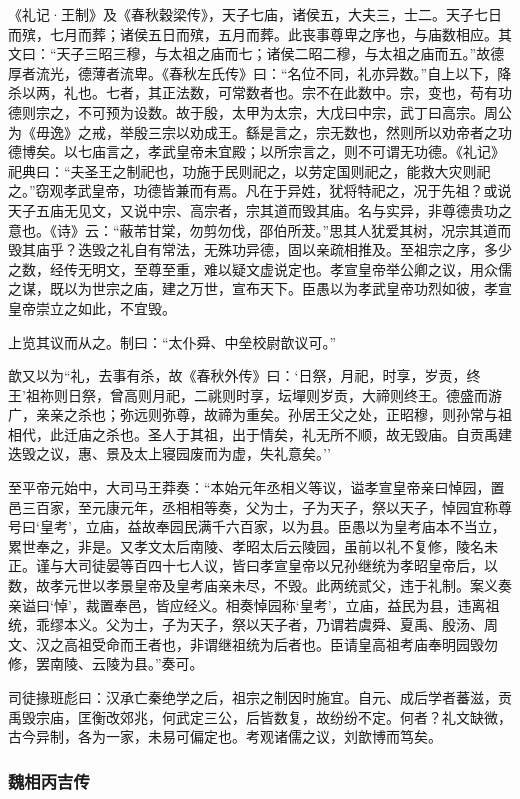 \documentclass[]{article}
\begin{document}
《礼记·王制》及《春秋穀梁传》，天子七庙，诸侯五，大夫三，士二。天子七日而殡，七月而葬；诸侯五日而殡，五月而葬。此丧事尊卑之序也，与庙数相应。其文曰：``天子三昭三穆，与太祖之庙而七；诸侯二昭二穆，与太祖之庙而五。''故德厚者流光，德薄者流卑。《春秋左氏传》曰：``名位不同，礼亦异数。''自上以下，降杀以两，礼也。七者，其正法数，可常数者也。宗不在此数中。宗，变也，苟有功德则宗之，不可预为设数。故于殷，太甲为太宗，大戊曰中宗，武丁曰高宗。周公为《毋逸》之戒，举殷三宗以劝成王。繇是言之，宗无数也，然则所以劝帝者之功德博矣。以七庙言之，孝武皇帝未宜殿；以所宗言之，则不可谓无功德。《礼记》祀典曰：``夫圣王之制祀也，功施于民则祀之，以劳定国则祀之，能救大灾则祀之。''窃观孝武皇帝，功德皆兼而有焉。凡在于异姓，犹将特祀之，况于先祖？或说天子五庙无见文，又说中宗、高宗者，宗其道而毁其庙。名与实异，非尊德贵功之意也。《诗》云：``蔽芾甘棠，勿剪勿伐，邵伯所茇。''思其人犹爱其树，况宗其道而毁其庙乎？迭毁之礼自有常法，无殊功异德，固以亲疏相推及。至祖宗之序，多少之数，经传无明文，至尊至重，难以疑文虚说定也。孝宣皇帝举公卿之议，用众儒之谋，既以为世宗之庙，建之万世，宣布天下。臣愚以为孝武皇帝功烈如彼，孝宣皇帝崇立之如此，不宜毁。

上览其议而从之。制曰：``太仆舜、中垒校尉歆议可。''

歆又以为``礼，去事有杀，故《春秋外传》曰：`日祭，月祀，时享，岁贡，终王'祖祢则日祭，曾高则月祀，二祧则时享，坛墠则岁贡，大禘则终王。德盛而游广，亲亲之杀也；弥远则弥尊，故禘为重矣。孙居王父之处，正昭穆，则孙常与祖相代，此迁庙之杀也。圣人于其祖，出于情矣，礼无所不顺，故无毁庙。自贡禹建迭毁之议，惠、景及太上寝园废而为虚，失礼意矣。''

至平帝元始中，大司马王莽奏：``本始元年丞相义等议，谥孝宣皇帝亲曰悼园，置邑三百家，至元康元年，丞相相等奏，父为士，子为天子，祭以天子，悼园宜称尊号曰`皇考'，立庙，益故奉园民满千六百家，以为县。臣愚以为皇考庙本不当立，累世奉之，非是。又孝文太后南陵、孝昭太后云陵园，虽前以礼不复修，陵名未正。谨与大司徒晏等百四十七人议，皆曰孝宣皇帝以兄孙继统为孝昭皇帝后，以数，故孝元世以孝景皇帝及皇考庙亲未尽，不毁。此两统贰父，违于礼制。案义奏亲谥曰`悼'，裁置奉邑，皆应经义。相奏悼园称`皇考'，立庙，益民为县，违离祖统，乖缪本义。父为士，子为天子，祭以天子者，乃谓若虞舜、夏禹、殷汤、周文、汉之高祖受命而王者也，非谓继祖统为后者也。臣请皇高祖考庙奉明园毁勿修，罢南陵、云陵为县。''奏可。

司徒掾班彪曰：汉承亡秦绝学之后，祖宗之制因时施宜。自元、成后学者蕃滋，贡禹毁宗庙，匡衡改郊兆，何武定三公，后皆数复，故纷纷不定。何者？礼文缺微，古今异制，各为一家，未易可偏定也。考观诸儒之议，刘歆博而笃矣。

\hypertarget{header-n5334}{%
\subsubsection{魏相丙吉传}\label{header-n5334}}
\end{document}
